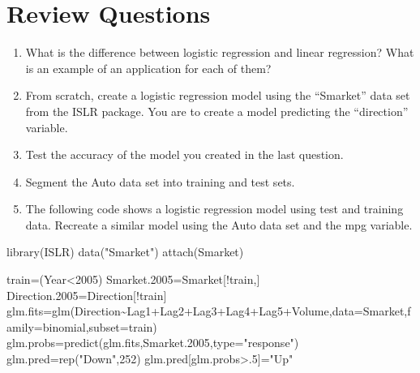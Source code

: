 \documentclass[
]{book}
\newenvironment{Shaded}{\begin{snugshade}}{\end{snugshade}}
\newcommand{\AttributeTok}[1]{\textcolor[rgb]{0.77,0.63,0.00}{#1}}
\newcommand{\DecValTok}[1]{\textcolor[rgb]{0.00,0.00,0.81}{#1}}
\newcommand{\FloatTok}[1]{\textcolor[rgb]{0.00,0.00,0.81}{#1}}
\newcommand{\FunctionTok}[1]{\textcolor[rgb]{0.00,0.00,0.00}{#1}}
\newcommand{\NormalTok}[1]{#1}
\newcommand{\OtherTok}[1]{\textcolor[rgb]{0.56,0.35,0.01}{#1}}
\newcommand{\SpecialCharTok}[1]{\textcolor[rgb]{0.00,0.00,0.00}{#1}}
\newcommand{\StringTok}[1]{\textcolor[rgb]{0.31,0.60,0.02}{#1}}
\begin{document}
\hypertarget{review-questions-2}{%
\section{Review Questions}\label{review-questions-2}}

\begin{enumerate}
\def\labelenumi{\arabic{enumi})}
\item
  What is the difference between logistic regression and linear regression? What is an example of an application for each of them?
\item
  From scratch, create a logistic regression model using the ``Smarket'' data set from the ISLR package. You are to create a model predicting the ``direction'' variable.
\item
  Test the accuracy of the model you created in the last question.
\item
  Segment the Auto data set into training and test sets.
\item
  The following code shows a logistic regression model using test and training data. Recreate a similar model using the Auto data set and the mpg variable.
\end{enumerate}

\begin{Shaded}
\begin{Highlighting}[]
\FunctionTok{library}\NormalTok{(ISLR)}
\FunctionTok{data}\NormalTok{(}\StringTok{"Smarket"}\NormalTok{)}
\FunctionTok{attach}\NormalTok{(Smarket)}

\NormalTok{train}\OtherTok{=}\NormalTok{(Year}\SpecialCharTok{\textless{}}\DecValTok{2005}\NormalTok{)}
\NormalTok{Smarket}\FloatTok{.2005}\OtherTok{=}\NormalTok{Smarket[}\SpecialCharTok{!}\NormalTok{train,]}
\NormalTok{Direction}\FloatTok{.2005}\OtherTok{=}\NormalTok{Direction[}\SpecialCharTok{!}\NormalTok{train]}
\NormalTok{glm.fits}\OtherTok{=}\FunctionTok{glm}\NormalTok{(Direction}\SpecialCharTok{\textasciitilde{}}\NormalTok{Lag1}\SpecialCharTok{+}\NormalTok{Lag2}\SpecialCharTok{+}\NormalTok{Lag3}\SpecialCharTok{+}\NormalTok{Lag4}\SpecialCharTok{+}\NormalTok{Lag5}\SpecialCharTok{+}\NormalTok{Volume,}\AttributeTok{data=}\NormalTok{Smarket,}\AttributeTok{family=}\NormalTok{binomial,}\AttributeTok{subset=}\NormalTok{train)}
\NormalTok{glm.probs}\OtherTok{=}\FunctionTok{predict}\NormalTok{(glm.fits,Smarket}\FloatTok{.2005}\NormalTok{,}\AttributeTok{type=}\StringTok{"response"}\NormalTok{)}
\NormalTok{glm.pred}\OtherTok{=}\FunctionTok{rep}\NormalTok{(}\StringTok{"Down"}\NormalTok{,}\DecValTok{252}\NormalTok{)}
\NormalTok{glm.pred[glm.probs}\SpecialCharTok{\textgreater{}}\NormalTok{.}\DecValTok{5}\NormalTok{]}\OtherTok{=}\StringTok{"Up"}
\end{Highlighting}
\end{Shaded}
\end{document}

